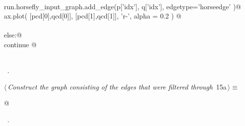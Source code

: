 \documentclass[11.5pt]{report}
\begin{document}
\begin{flushleft}
\begin{minipage}{\linewidth}
\begin{list}{}{}
\mbox{}\verb@@\\
\mbox{}\verb@                 run.horsefly_input_graph.add_edge(p['idx'], q['idx'], edgetype='horseedge' )@\\
\mbox{}\verb@                 ax.plot( [pcd[0],qcd[0]], [pcd[1],qcd[1]], 'r-', alpha = 0.2 ) @\\
\mbox{}\verb@@\\
\mbox{}\verb@             else:@\\
\mbox{}\verb@                 continue @\\
\mbox{}\verb@@\\
\mbox{}\verb@@{\NWsep}
\end{list}
\vspace{-1.5ex}
\footnotesize
\begin{list}{}{\setlength{\itemsep}{-\parsep}\setlength{\itemindent}{-\leftmargin}}
\item \NWtxtMacroRefIn\ .

\item{}
\end{list}
\end{minipage}\vspace{4ex}
\end{flushleft}

\begin{flushleft} \small
\begin{minipage}{\linewidth}\label{scrap17}\raggedright\small
{} $\langle\,${\itshape Construct the graph consisting of the edges that were filtered through}\nobreak\ {\footnotesize {15a}}$\,\rangle\equiv$
\vspace{-1ex}
\begin{list}{}{} \item
\mbox{}\verb@   @\\
\mbox{}\verb@@{\NWsep}
\end{list}
\vspace{-1.5ex}
\footnotesize
\begin{list}{}{\setlength{\itemsep}{-\parsep}\setlength{\itemindent}{-\leftmargin}}
\item \NWtxtMacroRefIn\ .

\item{}
\end{list}
\end{minipage}\vspace{4ex}
\end{flushleft}
\end{document}
